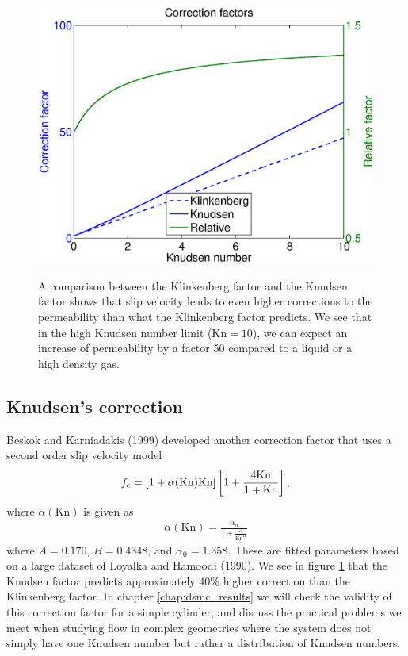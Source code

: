 \begin{figure}[h]
\begin{center}
\includegraphics[width=\textwidth, trim=0cm 0cm 0cm 0cm, clip]{figures/klinkenberg.eps}
\label{fig:klinkenberg_correction_factor}
\end{center}
\caption{A comparison between the Klinkenberg factor and the Knudsen factor shows that slip velocity leads to even higher corrections to the permeability than what the Klinkenberg factor predicts. We see that in the high Knudsen number limit ($\text{Kn}=10$), we can expect an increase of permeability by a factor 50 compared to a liquid or a high density gas.}
\end{figure}
\subsection{Knudsen's correction}
\label{sec:knudsen_correction}
Beskok and Karniadakis (1999) developed another correction factor that uses a second order slip velocity model 
\begin{align}
	\label{eq:knudsen_correction}
	f_c = [1 + \alpha(\text{Kn})\text{Kn}]\left[1 + {4\text{Kn}\over 1 + \text{Kn}}\right],
\end{align}
where $\alpha(\text{Kn})$ is given as\cite{civan2010effective}
\begin{align}
	\alpha(\text{Kn}) = \frac{\alpha_0}{1 + \frac{A}{\text{Kn}^B}}
\end{align} 
where $A=0.170$, $B=0.4348$, and $\alpha_0=1.358$. These are fitted parameters based on a large dataset of Loyalka and Hamoodi (1990). We see in figure \ref{fig:klinkenberg_correction_factor} that the Knudsen factor predicts approximately 40\% higher correction than the Klinkenberg factor. In chapter \ref{chap:dsmc_results} we will check the validity of this correction factor for a simple cylinder, and discuss the practical problems we meet when studying flow in complex geometries where the system does not simply have one Knudsen number but rather a distribution of Knudsen numbers.